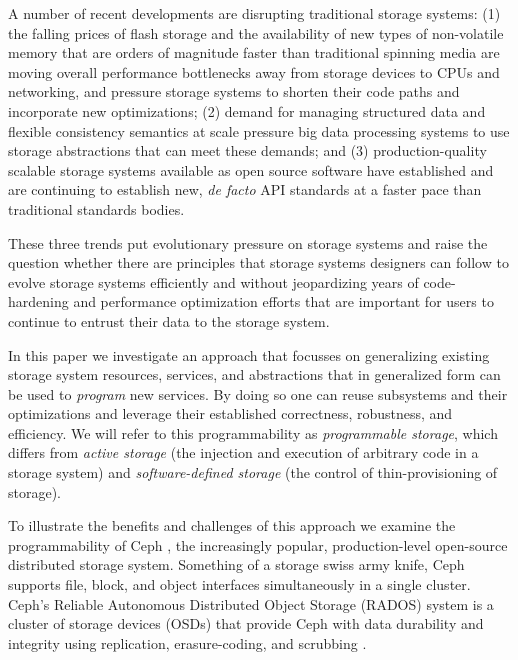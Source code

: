 \documentclass[10pt,twocolumn]{article}
\begin{document}
A number of recent developments are disrupting traditional storage
systems: (1) the falling prices of flash storage and the availability of
new types of non-volatile memory that are orders of magnitude faster
than traditional spinning media are moving overall performance
bottlenecks away from storage devices to CPUs and networking, and
pressure storage systems to shorten their code paths and incorporate new
optimizations; (2) demand for managing structured data and flexible
consistency semantics at scale pressure big data processing systems to
use storage abstractions that can meet these demands; and (3)
production-quality scalable storage systems available as open source
software have established and are continuing to establish new, \emph{de
facto} API standards at a faster pace than traditional standards bodies.

These three trends put evolutionary pressure on storage systems and
raise the question whether there are principles that storage systems
designers can follow to evolve storage systems efficiently and without
jeopardizing years of code-hardening and performance optimization
efforts that are important for users to continue to entrust their data
to the storage system.

In this paper we investigate an approach that focusses on generalizing
existing storage system resources, services, and abstractions that in
generalized form can be used to \emph{program} new services. By doing so
one can reuse subsystems and their optimizations and leverage their
established correctness, robustness, and efficiency. We will refer to
this programmability as \emph{programmable storage}, which differs from
\emph{active storage} (the injection and execution of arbitrary code in
a storage system) and \emph{software-defined storage} (the control of
thin-provisioning of storage).

To illustrate the benefits and challenges of this approach we examine
the programmability of Ceph \autocite{weil_ceph_2006}, the increasingly
popular, production-level open-source distributed storage system.
Something of a storage swiss army knife, Ceph supports file, block, and
object interfaces simultaneously in a single cluster. Ceph's Reliable Autonomous Distributed Object Storage (RADOS) system is a cluster of storage
devices (OSDs) that provide Ceph with data durability and integrity
using replication, erasure-coding, and scrubbing
\autocite{weil_rados_2007}. 
\end{document}
